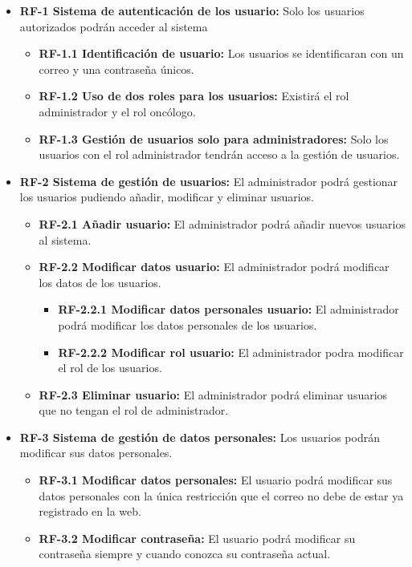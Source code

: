 \begin{itemize}
    \item \textbf{RF-1 Sistema de autenticación de los usuario:} Solo los usuarios autorizados podrán acceder al sistema
    \begin{itemize}
        \item \textbf{RF-1.1 Identificación de usuario:} Los usuarios se identificaran con un correo y una contraseña únicos.
        \item \textbf{RF-1.2 Uso de dos roles para los usuarios:} Existirá el rol administrador y el rol oncólogo.
    	\item \textbf{RF-1.3 Gestión de usuarios solo para administradores:} Solo los usuarios con el rol administrador tendrán acceso a la gestión de usuarios.
    \end{itemize}
    \item \textbf{RF-2 Sistema de gestión de usuarios:} El administrador podrá gestionar los usuarios pudiendo añadir, modificar y eliminar usuarios.
    \begin{itemize}
        \item \textbf{RF-2.1 Añadir usuario:} El administrador podrá añadir nuevos usuarios al sistema.
        \item \textbf{RF-2.2 Modificar datos usuario:} El administrador podrá modificar los datos de los usuarios.
        \begin{itemize}
            \item \textbf{RF-2.2.1 Modificar datos personales usuario:} El administrador podrá modificar los datos personales de los usuarios.
            \item \textbf{RF-2.2.2 Modificar rol usuario:} El administrador podra modificar el rol de los usuarios.
        \end{itemize}
        \item \textbf{RF-2.3 Eliminar usuario:} El administrador podrá eliminar usuarios que no tengan el rol de administrador.
    \end{itemize}
    \item \textbf{RF-3 Sistema de gestión de datos personales:} Los usuarios podrán
    modificar sus datos personales.
    \begin{itemize}
        \item \textbf{RF-3.1 Modificar datos personales:} El usuario podrá modificar sus datos personales con la única restricción que el correo no debe de estar ya registrado en la web.
        \item \textbf{RF-3.2 Modificar contraseña:} El usuario podrá modificar su contraseña siempre y cuando conozca su contraseña actual.

\end{itemize}
\end{itemize}
